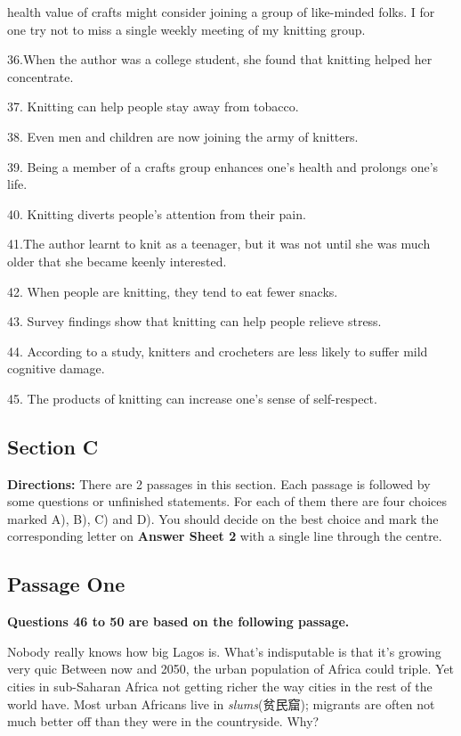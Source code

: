 \documentclass[UTF8,11pt]{ctexart}
\begin{document}
health value of crafts might consider joining a group of like-minded folks. I for one try not to miss a single weekly meeting of my knitting group.


36.When the author was a college student, she found that knitting helped her concentrate.


37. Knitting can help people stay away from tobacco.


38. Even men and children are now joining the army of knitters.


39. Being a member of a crafts group enhances one’s health and prolongs one’s life.


40. Knitting diverts people’s attention from their pain.


41.The author learnt to knit as a teenager, but it was not until she was much older that she became keenly interested.


42. When people are knitting, they tend to eat fewer snacks.


43. Survey findings show that knitting can help people relieve stress.


44. According to a study, knitters and crocheters are less likely to suffer mild cognitive damage.


45. The products of knitting can increase one’s sense of self-respect.


\subsection*{\textbf{Section C}}


\textbf{Directions:} There are 2 passages in this section. Each passage is followed by some questions or unfinished statements. For each of them there are four choices marked A), B), C) and D). You should decide on the best choice and mark the corresponding letter on\textbf{ Answer Sheet 2} with a single line through the centre.


\subsection*{\textbf{Passage One}}


\textbf{Questions 46 to 50 are based on the following passage.}


Nobody really knows how big Lagos is. What’s indisputable is that it’s growing very quic Between now and 2050, the urban population of Africa could triple. Yet cities in sub-Saharan Africa not getting richer the way cities in the rest of the world have. Most urban Africans live in\textit{ slums}(贫民窟); migrants are often not much better off than they were in the countryside. Why?
\end{document}
